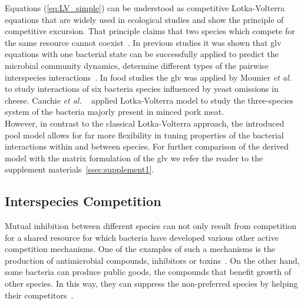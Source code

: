 \documentclass[10pt,twocolumn,5p]{elsarticle}
\numberwithin{equation}{section}
\newcommand{\etal}{{\textit{et al. }}}
\begin{document}
%
Equations (\ref{eq:LV_simple}) can be understood as competitive Lotka-Volterra equations that are widely used in ecological studies and show the principle of competitive excursion.
That principle claims that two species which compete for the same resource cannot coexist~\cite{wangersky_lotka-volterra_1978}.
In previous studies it was shown that \ac{glv} equations with one bacterial state can be successfully applied to predict the microbial community dynamics, determine different types of the pairwise interspecies interactions~\cite{dedrick_when_2023, stein_ecological_2013, venturelli_deciphering_2018, hoffmann_power_2007}.
In food studies the \ac{glv} was applied by Mounier \etal~\cite{mounier_microbial_2008} to study interactions of six bacteria species influenced by yeast omissions in cheese.
Cauchie \etal~\cite{cauchie_modeling_2020} applied Lotka-Volterra model to study the three-species system of the bacteria majorly present in minced pork meat.\\
%
However, in contrast to the classical Lotka-Volterra approach, the introduced pool model allows for far more flexibility in tuning properties of the bacterial interactions within and between species.
For further comparison of the derived model with the matrix formulation of the \ac{glv} we refer the reader to the supplement materials~\ref{ssec:supplement1}.
%
%
%
\subsection{Interspecies Competition}
Mutual inhibition between different species can not only result from competition for a shared resource for which bacteria have developed various other active competition mechanisms.
One of the examples of such a mechanisms is the production of antimicrobial compounds, inhibitors or toxins~\cite{wloch-salamon_effect_2008, chao_structured_1981}.
On the other hand, some bacteria can produce public goods, the compounds that benefit growth of other species.
In this way, they can suppress the non-preferred species by helping their competitors~\cite{hibbing_bacterial_2010}.
%
%
\end{document}
